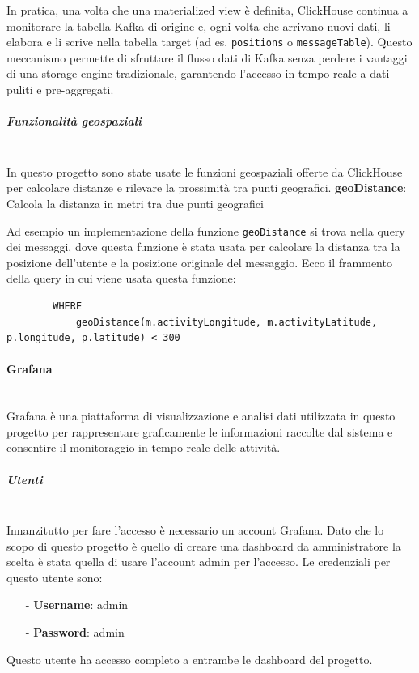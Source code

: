 \documentclass[10pt]{article}
\newcommand{\myparagraph}[1]{\paragraph{#1}\mbox{}\\}
\newcommand{\mysubparagraph}[1]{\subparagraph{#1}\mbox{}\\}
\begin{document}
        In pratica, una volta che una materialized view è definita, ClickHouse continua a monitorare la tabella Kafka di origine e, ogni volta che arrivano nuovi dati, li elabora e li scrive nella tabella target (ad es. \texttt{positions} o \texttt{messageTable}). Questo meccanismo permette di sfruttare il flusso dati di Kafka senza perdere i vantaggi di una storage engine tradizionale, garantendo l'accesso in tempo reale a dati puliti e pre-aggregati.


        \mysubparagraph{Funzionalità geospaziali}
        In questo progetto sono state usate le funzioni geospaziali offerte da ClickHouse per calcolare distanze e rilevare la prossimità tra punti geografici.
        \textbf{geoDistance}: Calcola la distanza in metri tra due punti geografici

        Ad esempio un implementazione della funzione \texttt{geoDistance} si trova nella query dei messaggi, dove questa funzione è stata usata per calcolare la distanza tra la posizione dell'utente e la posizione originale del messaggio.
        Ecco il frammento della query in cui viene usata questa funzione:
        \begin{lstlisting}
        WHERE
            geoDistance(m.activityLongitude, m.activityLatitude, p.longitude, p.latitude) < 300
        \end{lstlisting}

        \myparagraph{Grafana}
        Grafana è una piattaforma di visualizzazione e analisi dati utilizzata in questo progetto per rappresentare graficamente le informazioni raccolte dal sistema e consentire il monitoraggio in tempo reale delle attività.
        
        \mysubparagraph{Utenti}
        Innanzitutto per fare l'accesso è necessario un account Grafana. 
        Dato che lo scopo di questo progetto è quello di creare una dashboard da amministratore la scelta è stata quella di usare l'account admin per l'accesso.
        Le credenziali per questo utente sono:
        \begin{itemize}
            \item[-] \textbf{Username}: admin
            \item[-] \textbf{Password}: admin
        \end{itemize}
        Questo utente ha accesso completo a entrambe le dashboard del progetto.
\end{document}
